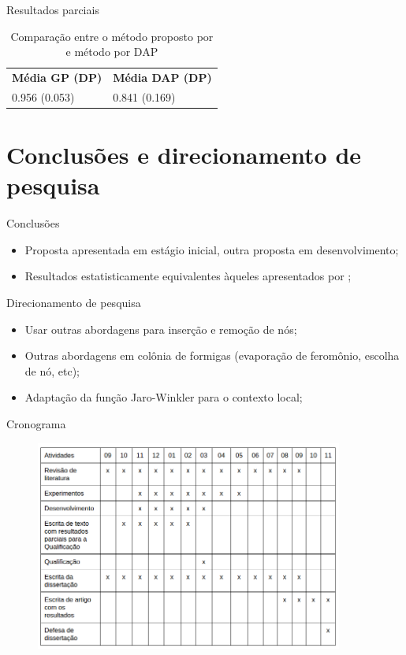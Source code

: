 \documentclass{beamer}
\newcommand\Fontvi{\fontsize{7}{7.2}\selectfont}
\begin{document}
  \begin{frame}{Resultados parciais}
        \begin{table}[H]
        \centering
        \caption{Comparação entre o método proposto por \cite{geneticrl} e método por DAP}
        \label{tbl:comparacao}
        \begin{tabular}{ll}
        \multicolumn{1}{c}{\textbf{Média GP (DP)}} & \multicolumn{1}{c}{\textbf{Média DAP (DP)}} \\
        0.956 (0.053)                                & 0.841 (0.169)
        \end{tabular}
        \end{table}
  \end{frame}


  \section{Conclusões e direcionamento de pesquisa}
  \begin{frame}{Conclusões}
      \begin{itemize}
          \item Proposta apresentada em estágio inicial, outra proposta em desenvolvimento;
          \item Resultados estatisticamente equivalentes àqueles apresentados por \cite{geneticrl};
      \end{itemize}
  \end{frame}
  \begin{frame}{Direcionamento de pesquisa}
      \Fontvi
      \begin{itemize}
          \item Usar outras abordagens para inserção e remoção de nós;
          \item Outras abordagens em colônia de formigas (evaporação de feromônio, escolha de nó, etc);
          \item Adaptação da função Jaro-Winkler para o contexto local;
      \end{itemize}
  \end{frame}

  \begin{frame}{Cronograma}
      \begin{figure}
          \centering
          \includegraphics[width=0.9\textwidth]{cronograma.png}
      \end{figure}
  \end{frame}
\end{document}
